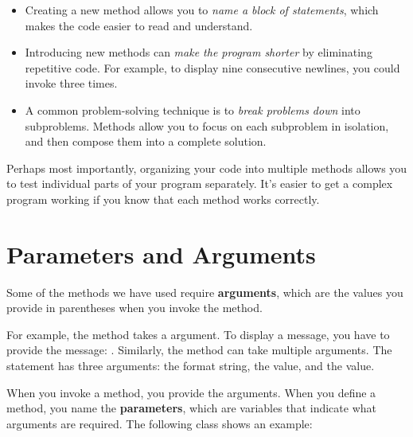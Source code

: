 \begin{itemize}

\item Creating a new method allows you to {\em name a block of statements}, which makes the code easier to read and understand.

\item Introducing new methods can {\em make the program shorter} by eliminating repetitive code.
For example, to display nine consecutive newlines, you could invoke  three times.

\item A common problem-solving technique is to {\em break problems down} into subproblems.
Methods allow you to focus on each subproblem in isolation, and then compose them into a complete solution.

\end{itemize}

Perhaps most importantly, organizing your code into multiple methods allows you to test individual parts of your program separately.
It's easier to get a complex program working if you know that each method works correctly.


\section{Parameters and Arguments}

Some of the methods we have used require {\bf arguments}, which are the values you provide in parentheses when you invoke the method.


For example, the  method takes a  argument.
To display a message, you have to provide the message: .
Similarly, the  method can take multiple arguments.
The statement  has three arguments: the format string, the  value, and the  value.



When you invoke a method, you provide the arguments.
When you define a method, you name the {\bf parameters}, which are variables that indicate what arguments are required.
The following class shows an example:

